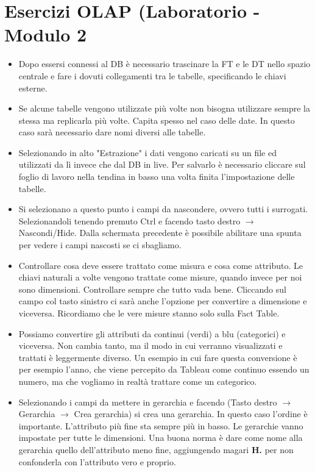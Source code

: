 \section{Esercizi OLAP (Laboratorio - Modulo 2}
\begin{itemize}
	\item Dopo essersi connessi al DB è necessario trascinare la FT e le DT nello spazio centrale e fare i dovuti collegamenti tra le tabelle, specificando le chiavi esterne.
	\item Se alcune tabelle vengono utilizzate più volte non bisogna utilizzare sempre la stessa ma replicarla più volte. Capita spesso nel caso delle date. In questo caso sarà necessario dare nomi diversi alle tabelle.
	\item Selezionando in alto "Estrazione" i dati vengono caricati su un file ed utilizzati da lì invece che dal DB in live. Per salvarlo è necessario cliccare sul foglio di lavoro nella tendina in basso una volta finita l'impostazione delle tabelle.
	\item Si selezionano a questo punto i campi da nascondere, ovvero tutti i surrogati. Selezionandoli tenendo premuto Ctrl e facendo tasto destro $\xrightarrow{}$ Nascondi/Hide. Dalla schermata precedente è possibile abilitare una spunta per vedere i campi nascosti se ci sbagliamo.
	\item Controllare cosa deve essere trattato come misura e cosa come attributo. Le chiavi naturali a volte vengono trattate come misure, quando invece per noi sono dimensioni. Controllare sempre che tutto vada bene. Cliccando sul campo col tasto sinistro ci sarà anche l'opzione per convertire a dimensione e viceversa. Ricordiamo che le vere misure stanno solo sulla Fact Table.
	\item Possiamo convertire gli attributi da continui (verdi) a blu (categorici) e viceversa. Non cambia tanto, ma il modo in cui verranno visualizzati e trattati è leggermente diverso. Un esempio in cui fare questa conversione è per esempio l'anno, che viene percepito da Tableau come continuo essendo un numero, ma che vogliamo in realtà trattare come un categorico.
	\item Selezionando i campi da mettere in gerarchia e facendo (Tasto destro $\xrightarrow{}$ Gerarchia $\xrightarrow{}$ Crea gerarchia) si crea una gerarchia. In questo caso l'ordine è importante. L'attributo più fine sta sempre più in basso.
	Le gerarchie vanno impostate per tutte le dimensioni. Una buona norma è dare come nome alla gerarchia quello dell'attributo meno fine, aggiungendo magari \textbf{H.} per non confonderla con l'attributo vero e proprio.\newline

\end{itemize}
